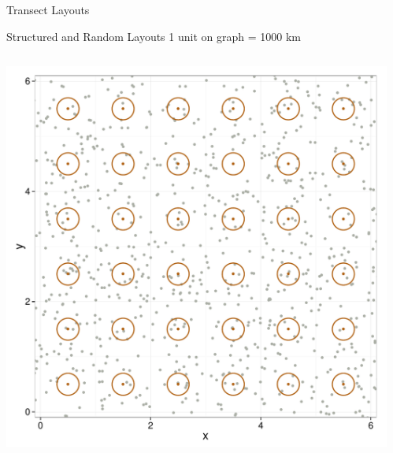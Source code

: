 \documentclass{beamer}
\begin{document}
\begin{frame}{Transect Layouts}
\end{frame}

\begin{frame}{Structured and Random Layouts}
1 unit on graph = 1000 km
	\begin{columns}
		\begin{column}{0.48\textwidth}
			\includegraphics[width=\textwidth]{../images/slides-layoutS.pdf}
		\end{column}
		\begin{column}{0.48\textwidth}

\end{column}
\end{columns}
\end{frame}
\end{document}
